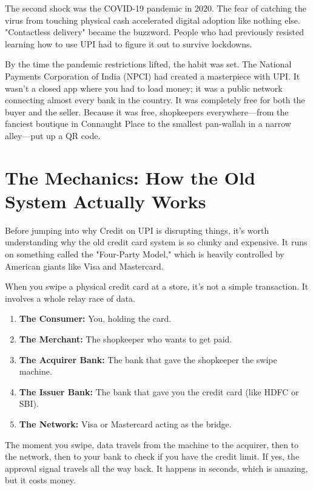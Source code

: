 The second shock was the COVID-19 pandemic in 2020. The fear of catching the virus from touching physical cash accelerated digital adoption like nothing else. "Contactless delivery" became the buzzword. People who had previously resisted learning how to use UPI had to figure it out to survive lockdowns.

By the time the pandemic restrictions lifted, the habit was set. The National Payments Corporation of India (NPCI) had created a masterpiece with UPI. It wasn't a closed app where you had to load money; it was a public network connecting almost every bank in the country. It was completely free for both the buyer and the seller. Because it was free, shopkeepers everywhere---from the fanciest boutique in Connaught Place to the smallest pan-wallah in a narrow alley---put up a QR code.

\section{The Mechanics: How the Old System Actually Works}

Before jumping into why Credit on UPI is disrupting things, it's worth understanding why the old credit card system is so clunky and expensive. It runs on something called the "Four-Party Model," which is heavily controlled by American giants like Visa and Mastercard.

When you swipe a physical credit card at a store, it's not a simple transaction. It involves a whole relay race of data.
\begin{enumerate}
    \item \textbf{The Consumer:} You, holding the card.
    \item \textbf{The Merchant:} The shopkeeper who wants to get paid.
    \item \textbf{The Acquirer Bank:} The bank that gave the shopkeeper the swipe machine.
    \item \textbf{The Issuer Bank:} The bank that gave you the credit card (like HDFC or SBI).
    \item \textbf{The Network:} Visa or Mastercard acting as the bridge.
\end{enumerate}

The moment you swipe, data travels from the machine to the acquirer, then to the network, then to your bank to check if you have the credit limit. If yes, the approval signal travels all the way back. It happens in seconds, which is amazing, but it costs money.

